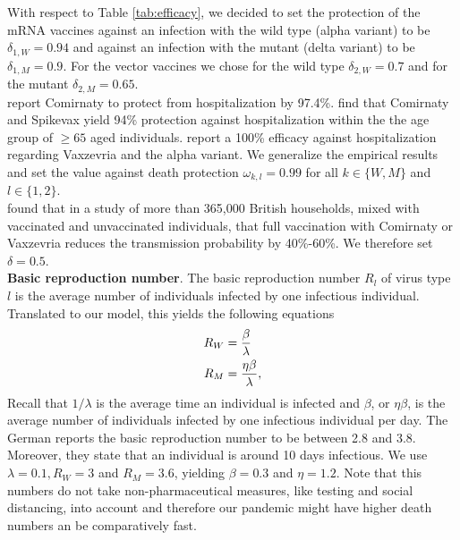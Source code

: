 With respect to Table \ref{tab:efficacy}, we decided to set the protection of the mRNA vaccines against an infection with the wild type (alpha variant) to be $\delta_{1, W} = 0.94$ and against an infection with the mutant (delta variant) to be $\delta_{1, M} = 0.9$. For the vector vaccines we chose for the wild type $\delta_{2, W} = 0.7$ and for the mutant $\delta_{2, M} = 0.65$.\\

\cite{Abu.2021} report Comirnaty to protect from hospitalization by 97.4\%. \cite{Tenforde.2021} find that Comirnaty and Spikevax yield 94\% protection against hospitalization within the the age group of $\geq 65$ aged individuals. \cite{Voysey.2021} report a 100\% efficacy against hospitalization regarding Vaxzevria and the alpha variant. We generalize the empirical results and set the value against death protection $\omega_{k,l} = 0.99$ for all $k \in \{W,M\}$ and $l \in \{1,2\}$.\\

\cite{Harris.2021} found that in a study of more than 365,000 British households, mixed with vaccinated and unvaccinated individuals, that full vaccination with Comirnaty or Vaxzevria reduces the transmission probability by 40\%-60\%. We therefore set $\delta = 0.5$. \\

\textbf{Basic reproduction number}. The basic reproduction number $R_l$ of virus type $l$ is the average number of individuals infected by one infectious individual. Translated to our model, this yields the following equations 
\begin{align}
R_W &= \frac{\beta}{\lambda} \\
R_M &= \frac{\eta \beta}{\lambda}, \notag
\end{align}
Recall that $1/\lambda$ is the average time an individual is infected and $\beta$, or $\eta \beta$, is the average number of individuals infected by one infectious individual per day. The German \cite{RKI.2021} reports the basic reproduction number to be between 2.8 and 3.8. Moreover, they state that an individual is around 10 days infectious. We use $\lambda = 0.1, R_W = 3$ and $R_M = 3.6$, yielding $\beta = 0.3$ and $\eta = 1.2$. Note that this numbers do not take non-pharmaceutical measures, like testing and social distancing, into account and therefore our pandemic might have higher death numbers an be comparatively fast. \\%

